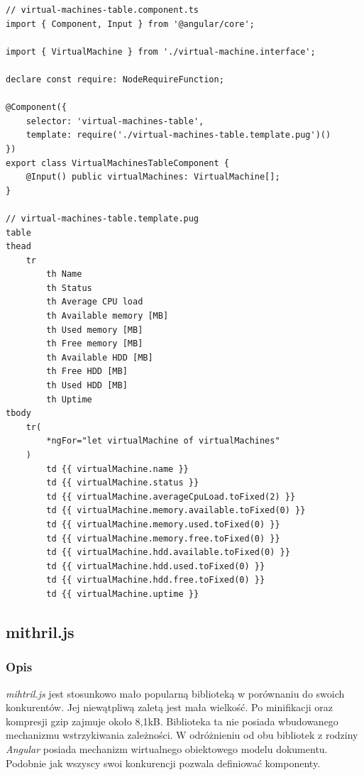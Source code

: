 \documentclass[polish, twoside, 12pt]{mwart}
\begin{document}
\begin{lstlisting}[caption=Komponent tabeli]
// virtual-machines-table.component.ts
import { Component, Input } from '@angular/core';

import { VirtualMachine } from './virtual-machine.interface';

declare const require: NodeRequireFunction;

@Component({
    selector: 'virtual-machines-table',
    template: require('./virtual-machines-table.template.pug')()
})
export class VirtualMachinesTableComponent {
    @Input() public virtualMachines: VirtualMachine[];
}

// virtual-machines-table.template.pug
table
thead
    tr
        th Name
        th Status
        th Average CPU load
        th Available memory [MB]
        th Used memory [MB]
        th Free memory [MB]
        th Available HDD [MB]
        th Free HDD [MB]
        th Used HDD [MB]
        th Uptime
tbody
    tr(
        *ngFor="let virtualMachine of virtualMachines"
    )
        td {{ virtualMachine.name }}
        td {{ virtualMachine.status }}
        td {{ virtualMachine.averageCpuLoad.toFixed(2) }}
        td {{ virtualMachine.memory.available.toFixed(0) }}
        td {{ virtualMachine.memory.used.toFixed(0) }}
        td {{ virtualMachine.memory.free.toFixed(0) }}
        td {{ virtualMachine.hdd.available.toFixed(0) }}
        td {{ virtualMachine.hdd.used.toFixed(0) }}
        td {{ virtualMachine.hdd.free.toFixed(0) }}
        td {{ virtualMachine.uptime }}
\end{lstlisting}

\subsection{mithril.js}

\subsubsection{Opis}

\emph{mihtril.js} \cite{mithril.js} jest stosunkowo mało popularną biblioteką w porównaniu do swoich konkurentów. Jej niewątpliwą zaletą jest mała wielkość. Po minifikacji oraz kompresji gzip zajmuje około 8,1kB. Biblioteka ta nie posiada wbudowanego mechanizmu wstrzykiwania zależności. W odróżnieniu od obu bibliotek z rodziny \emph{Angular} posiada mechanizm wirtualnego obiektowego modelu dokumentu. Podobnie jak wszyscy swoi konkurencji pozwala definiować komponenty.
\end{document}
